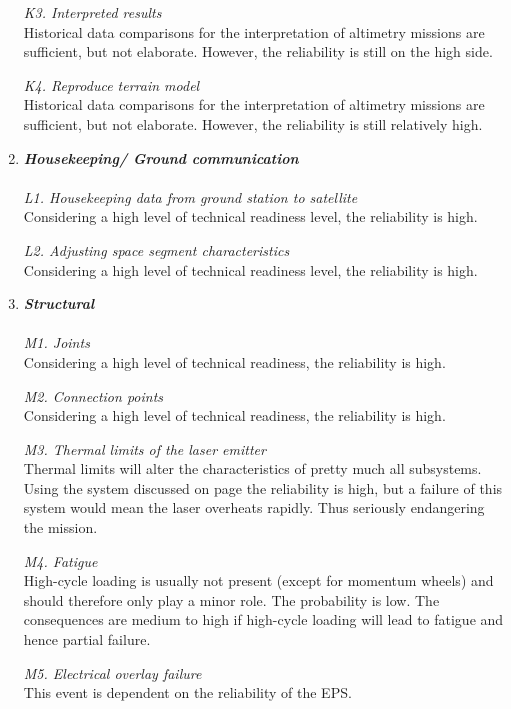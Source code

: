 \begin{enumerate}[A]
\textit{K3. Interpreted results}\\ 
Historical data comparisons for the interpretation of altimetry missions are sufficient, but not elaborate. However, the reliability is still on the high side.

\textit{K4. Reproduce terrain model}\\
Historical data comparisons for the interpretation of altimetry missions are sufficient, but not elaborate. However, the reliability is still relatively high.
 
	\item\textbf{\textit{Housekeeping/ Ground communication}} \\\\
\textit{L1. Housekeeping data from ground station to satellite}\\ 
Considering a high level of technical readiness level, the reliability is high.

\textit{L2. Adjusting space segment characteristics}\\ 
Considering a high level of technical readiness level, the reliability is high.

	\item\textbf{\textit{Structural}} \\\\
\textit{M1. Joints}\\ 
Considering a high level of technical readiness, the reliability is high.

\textit{M2. Connection points}\\ 
Considering a high level of technical readiness, the reliability is high.

\textit{M3. Thermal limits of the laser emitter}\\ 
Thermal limits will alter the characteristics of pretty much all subsystems. Using the system discussed on page \pageref{opticalthermal} the reliability is high, but a failure of this system would mean the laser overheats rapidly. Thus seriously endangering the mission.

\textit{M4. Fatigue}\\ 
High-cycle loading is usually not present (except for momentum wheels) and should therefore only play a minor role. The probability is low. The consequences are medium to high if high-cycle loading will lead to fatigue and hence partial failure.

\textit{M5. Electrical overlay failure}\\ 
This event is dependent on the reliability of the EPS.


\end{enumerate}
